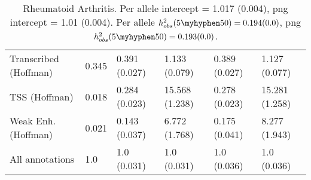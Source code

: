 \documentclass[11pt]{article}
\begin{document}
\begin{table}[H]
\begin{center}
\begin{tabular}{l|lllll}
Transcribed (Hoffman)  &  0.345 & 0.391 (0.027) & 1.133 (0.079) &
0.389 (0.027) & 1.127 (0.077) \\
TSS (Hoffman)  &  0.018 & 0.284 (0.023) & 15.568 (1.238) &
0.278 (0.023) & 15.281 (1.258) \\
Weak Enh. (Hoffman)  &  0.021 & 0.143 (0.037) & 6.772 (1.768) &
0.175 (0.041) & 8.277 (1.943) \\
All annotations  &  1.0 & 1.0 (0.031) & 1.0 (0.031) &
1.0 (0.036) & 1.0 (0.036) \\
\end{tabular}
\caption{Rheumatoid Arthritis.
Per allele intercept = 1.017 (0.004),
png intercept = 1.01 (0.004).
Per allele $h^2_{obs}(5\myhyphen50) = 0.194 (0.0)$,
png $h^2_{obs}(5\myhyphen50) = 0.193 (0.0)$.}
\end{center}
\end{table}
\end{document}
